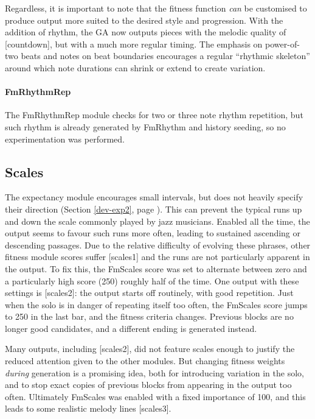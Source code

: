 Regardless, it is important to note that the fitness function \emph{can} be customised to produce output more suited to the desired style and progression. With the addition of rhythm, the GA now outputs pieces with the melodic quality of [countdown], but with a much more regular timing. The emphasis on power-of-two beats and notes on beat boundaries encourages a regular ``rhythmic skeleton'' around which note durations can shrink or extend to create variation.

\paragraph{FmRhythmRep} The FmRhythmRep module checks for two or three note rhythm repetition, but such rhythm is already generated by FmRhythm and history seeding, so no experimentation was performed.

\subsection{Scales}
\label{test-scales}

The expectancy module encourages small intervals, but does not heavily specify their direction (Section \ref{dev-exp2}, page \pageref{dev-exp2}). This can prevent the typical runs up and down the scale commonly played by jazz musicians. Enabled all the time, the output seems to favour such runs more often, leading to sustained ascending or descending passages. Due to the relative difficulty of evolving these phrases, other fitness module scores suffer [scales1] and the runs are not particularly apparent in the output. To fix this, the FmScales score was set to alternate between zero and a particularly high score (250) roughly half of the time. One output with these settings is [scales2]: the output starts off routinely, with good repetition. Just when the solo is in danger of repeating itself too often, the FmScales score jumps to 250 in the last bar, and the fitness criteria changes. Previous blocks are no longer good candidates, and a different ending is generated instead.

Many outputs, including [scales2], did not feature scales enough to justify the reduced attention given to the other modules. But changing fitness weights \emph{during} generation is a promising idea, both for introducing variation in the solo, and to stop exact copies of previous blocks from appearing in the output too often. Ultimately FmScales was enabled with a fixed importance of 100, and this leads to some realistic melody lines [scales3].

